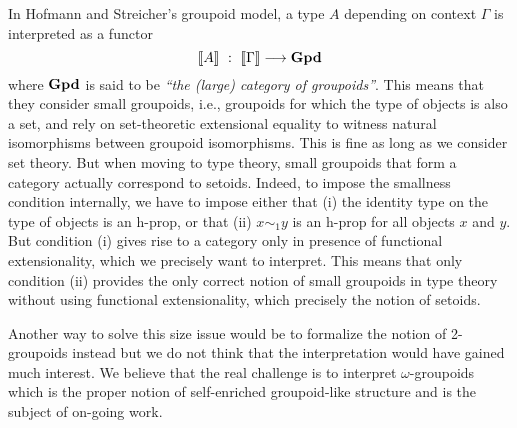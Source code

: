 In Hofmann and Streicher's groupoid model, a type $A$ depending on
context $\Gamma$ is interpreted as a functor 
$$
\sem{A} \ : \ \sem{\Gamma} \longrightarrow \GPD
$$
%
where $\mathbf{Gpd}$ is said to be \emph{``the (large) category of groupoids''}. 
%
This means that they consider small groupoids, 
i.e., groupoids for which the type of objects is also a set, and
rely on set-theoretic extensional equality to witness natural
isomorphisms between groupoid isomorphisms. This is fine as long as we
consider set theory.
%
%
%
But when moving to type theory, small groupoids that form a
category actually correspond to setoids. Indeed, to impose the
smallness condition internally, we have to impose either that (i)
the identity type on the type of objects is an h-prop, or that (ii) $x
\sim_1 y$ is an h-prop for all objects $x$ and $y$. But
condition (i) gives rise to a category only in presence of functional
extensionality, which we precisely want to interpret.
%
This means that only condition (ii) provides the only correct notion
of small groupoids in type theory without using functional
extensionality, which precisely the notion of setoids.
%
%

Another way to solve this size issue would be to formalize the notion of
2-groupoids instead but we do not think that the interpretation would
have gained much interest. We believe that the real challenge is to interpret
$\omega$-groupoids which is the proper notion of self-enriched 
groupoid-like structure and is the subject of on-going work.

